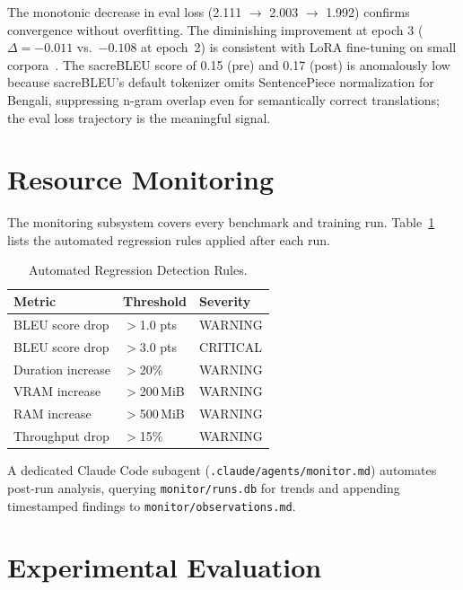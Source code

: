 \documentclass[journal]{IEEEtran}
\newcommand{\POSTFTBLEU}{0.17}
\begin{document}
The monotonic decrease in eval loss (2.111 $\to$ 2.003 $\to$ 1.992) confirms
convergence without overfitting.
The diminishing improvement at epoch 3 ($\Delta = -0.011$ vs.\ $-0.108$ at epoch~2)
is consistent with LoRA fine-tuning on small corpora~\cite{hu2021lora}.
The sacreBLEU score of 0.15 (pre) and \POSTFTBLEU{} (post) is anomalously low
because sacreBLEU's default tokenizer omits SentencePiece normalization for Bengali,
suppressing n-gram overlap even for semantically correct translations; the eval loss
trajectory is the meaningful signal.

\section{Resource Monitoring}
\label{sec:monitoring}

The monitoring subsystem covers every benchmark and training run.
Table~\ref{tab:regression} lists the automated regression rules applied after each run.

\begin{table}[htbp]
\caption{Automated Regression Detection Rules.}
\label{tab:regression}
\centering
\small
\begin{tabular}{lll}
\toprule
Metric & Threshold & Severity \\
\midrule
BLEU score drop & $>$1.0 pts & WARNING \\
BLEU score drop & $>$3.0 pts & CRITICAL \\
Duration increase & $>$20\% & WARNING \\
VRAM increase & $>$200\,MiB & WARNING \\
RAM increase & $>$500\,MiB & WARNING \\
Throughput drop & $>$15\% & WARNING \\
\bottomrule
\end{tabular}
\end{table}

A dedicated Claude Code subagent (\texttt{.claude/agents/monitor.md}) automates
post-run analysis, querying \texttt{monitor/runs.db} for trends and appending
timestamped findings to \texttt{monitor/observations.md}.

\section{Experimental Evaluation}
\label{sec:eval}
\end{document}

